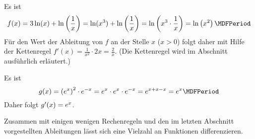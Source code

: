 \begin{MExercises}
\begin{MExercise}
\begin{MHint}{\iSolution}
 \begin{MExerciseItems}
  \item Es ist
  \[
   f(x) = 3 \ln (x) + \ln \left( \frac1x \right) = \ln (x^3) + \ln \left( \frac1x \right) = \ln \left( x^3 \cdot \frac1x \right)
   = \ln \left( x^2 \right) \MDFPeriod
  \]
  Für den Wert der Ableitung von $f$ an der Stelle $x$ ($x>0$) folgt daher mit Hilfe der Kettenregel
  $f'(x) = \frac{1}{x^2} \cdot 2 x = \frac{2}{x}$. (Die Kettenregel wird im Abschnitt  ausführlich erläutert.)
  \item Es ist
  \[
  g(x) = \left( \MEU^x \right)^2 \cdot \MEU^{-x} = \MEU^x \cdot \MEU^x \cdot \MEU^{-x} = \MEU^{x+x-x} = \MEU^x \MDFPeriod
  \]
  Daher folgt $g'(x) = e^x$.
 \end{MExerciseItems}
\end{MHint}
\end{MExercise}

\end{MExercises}




\begin{MIntro}
Zusammen mit einigen wenigen Rechenregeln und den im letzten Abschnitt 
vorgestellten Ableitungen lässt sich eine Vielzahl an Funktionen 
differenzieren.
\end{MIntro}

